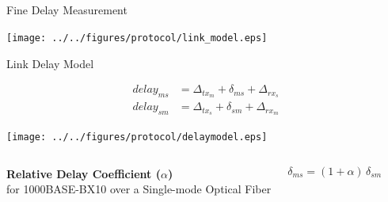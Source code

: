 \documentclass[compress,red]{beamer}
\begin{document}
\subsection{}
\begin{frame}{Fine Delay Measurement}

  \begin{center}
  \texttt{[image: ../../figures/protocol/link\_model.eps]}
  \end{center}

\end{frame}

\begin{frame}{Link Delay Model}

  \begin{align}
    \nonumber delay_{ms} &= \Delta_{tx_m} + \delta_{ms} + \Delta_{rx_s} \\
    \nonumber delay_{sm} &= \Delta_{tx_s} + \delta_{sm} + \Delta_{rx_m}
  \end{align}

   \vspace{0.2cm}

  \begin{center}
  \texttt{[image: ../../figures/protocol/delaymodel.eps]}
  \end{center}

\begin{columns}[c]
  \column{2.8in}

    \begin{center}
      \textbf{Relative Delay Coefficient ($\alpha$)} \\
      for 1000BASE-BX10 over a Single-mode Optical Fiber
    \end{center}

  \column{1.5in}
    \begin{center}
      \begin{equation}
      \nonumber \delta_{ms} = (1 + \alpha) \, \delta_{sm}
      \end{equation}
    \end{center}
    \vspace{0.5cm}
\end{columns}
  
\end{frame}
\end{document}
